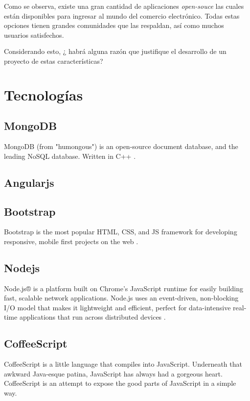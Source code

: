 Como se observa, existe una gran cantidad de aplicaciones \textit{open-souce} las cuales están disponibles para ingresar al mundo del comercio electrónico. Todas estas opciones tienen grandes comunidades que las respaldan, así como muchos usuarios satisfechos. 

Considerando esto, ¿ habrá alguna razón que justifique el desarrollo de un proyecto de estas características?

\section{Tecnologías }\label{cap:estadoArte:tecnologias}

	\subsection{MongoDB}
	MongoDB (from "humongous") is an open-source document database, and the leading NoSQL database. Written in C++ \cite{technology_mongodb}.
	
	\subsection{Angularjs}
	\cite{technology_angularjs}
	
	\subsection{Bootstrap}
	Bootstrap is the most popular HTML, CSS, and JS framework for developing responsive, mobile first projects on the web \cite{technology_bootstrap}.
	
	\subsection{Nodejs}
	Node.js® is a platform built on Chrome's JavaScript runtime for easily building fast, scalable network applications. Node.js uses an event-driven, non-blocking I/O model that makes it lightweight and efficient, perfect for data-intensive real-time applications that run across distributed devices \cite{technology_nodejs}.
	
	\subsection{CoffeeScript}
	CoffeeScript is a little language that compiles into JavaScript. Underneath that awkward Java-esque patina, JavaScript has always had a gorgeous heart. CoffeeScript is an attempt to expose the good parts of JavaScript in a simple way.
	
